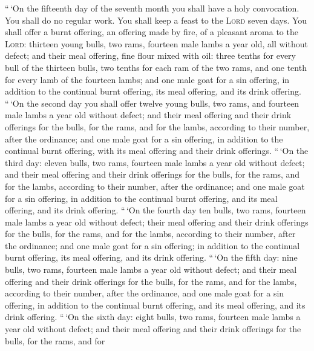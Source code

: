  ``\,`On the fifteenth day of the seventh month you shall
have a holy convocation. You shall do no regular work. You shall keep a
feast to the \textsc{Lord} seven days.  You shall offer a
burnt offering, an offering made by fire, of a pleasant aroma to the
\textsc{Lord}: thirteen young bulls, two rams, fourteen male lambs a
year old, all without defect;  and their meal offering,
fine flour mixed with oil: three tenths for every bull of the thirteen
bulls, two tenths for each ram of the two rams,  and one
tenth for every lamb of the fourteen lambs;  and one male
goat for a sin offering, in addition to the continual burnt offering,
its meal offering, and its drink offering.  ``\,`On the
second day you shall offer twelve young bulls, two rams, and fourteen
male lambs a year old without defect;  and their meal
offering and their drink offerings for the bulls, for the rams, and for
the lambs, according to their number, after the ordinance;
 and one male goat for a sin offering, in addition to the
continual burnt offering, with its meal offering and their drink
offerings.  ``\,`On the third day: eleven bulls, two
rams, fourteen male lambs a year old without defect;  and
their meal offering and their drink offerings for the bulls, for the
rams, and for the lambs, according to their number, after the ordinance;
 and one male goat for a sin offering, in addition to the
continual burnt offering, and its meal offering, and its drink offering.
 ``\,`On the fourth day ten bulls, two rams, fourteen
male lambs a year old without defect;  their meal
offering and their drink offerings for the bulls, for the rams, and for
the lambs, according to their number, after the ordinance;
 and one male goat for a sin offering; in addition to the
continual burnt offering, its meal offering, and its drink offering.
 ``\,`On the fifth day: nine bulls, two rams, fourteen
male lambs a year old without defect;  and their meal
offering and their drink offerings for the bulls, for the rams, and for
the lambs, according to their number, after the ordinance,
 and one male goat for a sin offering, in addition to the
continual burnt offering, and its meal offering, and its drink offering.
 ``\,`On the sixth day: eight bulls, two rams, fourteen
male lambs a year old without defect;  and their meal
offering and their drink offerings for the bulls, for the rams, and for
